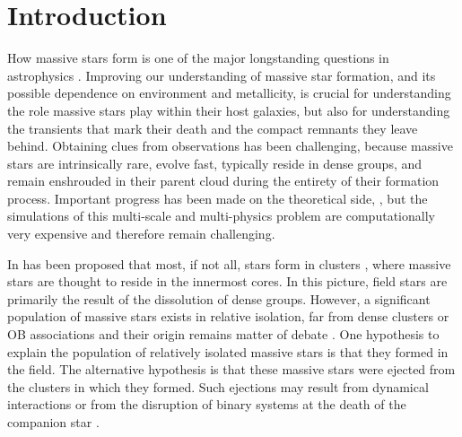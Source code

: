 \documentclass[apjl,twocolumn]{emulateapj}
\begin{document}
\maketitle{}

\section{Introduction}
\label{sec:intro}

How massive stars form is one of the major longstanding questions in astrophysics
\citep[e.g.,][]{zinnecker:07}. Improving our understanding of massive star formation, and its
possible dependence on environment and metallicity, is crucial for understanding the role massive stars play within their host galaxies, but also for understanding the transients that mark their death and the compact remnants they leave behind.
%
Obtaining clues from observations has been challenging, because massive stars are intrinsically rare, 
evolve fast, typically reside in dense groups, and remain enshrouded in
their parent cloud during the entirety of their formation
process. Important progress has been made on the theoretical side,
\citep[e.g.][]{bate:09,kuiper:15,rosen:16}, but the simulations of this multi-scale and multi-physics problem are computationally very expensive and therefore remain challenging.  

In has been proposed that most, if not all, stars form in clusters \citep{lada:03}, where massive stars are thought to reside in the innermost cores. In this picture, field stars are primarily the result of the dissolution of dense groups.  However, a significant population of massive stars exists in relative isolation, far from dense clusters or OB associations and their origin remains matter of debate \citep{gvaramadze:12, lamb:16,ward:18}.   One hypothesis to explain the population of relatively isolated massive stars is that they formed in the field. The alternative hypothesis is that these massive stars were ejected from the clusters in which they formed.  Such ejections may result from dynamical interactions \citep[e.g.,][]{poveda:67} or from the disruption of binary systems at the death of the companion  star \citep[e.g.,][]{zwicky:57, blaauw:61, eldridge:11, renzo:18}. 
 
\end{document}
